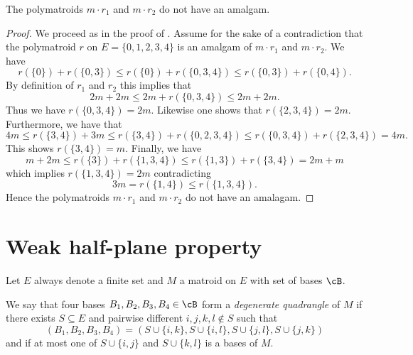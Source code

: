 \begin{thm}
    The polymatroids $m\cdot r_1$ and $m\cdot r_2$ do not have an amalgam.
\end{thm}

\begin{proof}
    We proceed as in the proof of \cite[Theorem~2]{sticky}.
    Assume for the sake of a contradiction that the polymatroid $r$ on $E=\{0,1,2,3,4\}$ is an amalgam of $m\cdot r_1$ and $m\cdot r_2$. We have
    \begin{equation*}
        r(\{0\})+r(\{0,3\})\leq r(\{0\})+r(\{0,3,4\})\leq r(\{0,3\})+r(\{0,4\}).
    \end{equation*}
    By definition of $r_1$ and $r_2$ this implies that
    \begin{equation*}
        2m+2m\leq 2m+r(\{0,3,4\})\leq 2m+2m.
    \end{equation*}
    Thus we have $r(\{0,3,4\})=2m$. Likewise one shows that $r(\{2,3,4\})=2m$. Furthermore, we have that
    \begin{equation*}
      4m\leq r(\{3,4\})+3m \leq r(\{3,4\})+r(\{0,2,3,4\})\leq r(\{0,3,4\})+r(\{2,3,4\})=4m.
    \end{equation*}
    This shows $r(\{3,4\})=m$. Finally, we have
    \begin{equation*}
      m+2m\leq  r(\{3\})+r(\{1,3,4\}) \leq r(\{1,3\})+r(\{3,4\}) =2m+m
    \end{equation*}
    which implies $r(\{1,3,4\})=2m$ contradicting
    \begin{equation*}
        3m=r(\{1,4\})\leq r(\{1,3,4\}).
     \end{equation*}
     Hence the polymatroids $m\cdot r_1$ and $m\cdot r_2$ do not have an amalagam.
\end{proof}

\section{Weak half-plane property}\label{sec:whpp}
Let $E$ always denote a finite set and $M$ a matroid on $E$ with set of bases $\cB$.

\begin{Def}
    We say that four bases $B_1,B_2,B_3,B_4\in\cB$ form a \emph{degenerate quadrangle} of $M$ if there exists $S\subseteq E$ and pairwise different $i,j,k,l\notin S$ such that 
    \begin{equation*}
      (B_1,B_2,B_3,B_4)=(S\cup\{i,k\},S\cup\{i,l\},S\cup\{j,l\},S\cup\{j,k\})  
    \end{equation*}
    and if at most one of $S\cup\{i,j\}$ and $S\cup\{k,l\}$ is a bases of $M$. 
\end{Def}

